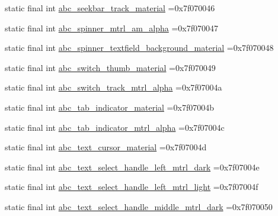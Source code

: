 \begin{DoxyCompactItemize}
\item 
static final int \mbox{\hyperlink{classcom_1_1example_1_1trainawearapplication_1_1_r_1_1drawable_a6616ac504b1ff425dd1a6e82d7d2d414}{abc\+\_\+seekbar\+\_\+track\+\_\+material}} =0x7f070046
\item 
static final int \mbox{\hyperlink{classcom_1_1example_1_1trainawearapplication_1_1_r_1_1drawable_acdfd04de80b7e99709e8a3433aac7b28}{abc\+\_\+spinner\+\_\+mtrl\+\_\+am\+\_\+alpha}} =0x7f070047
\item 
static final int \mbox{\hyperlink{classcom_1_1example_1_1trainawearapplication_1_1_r_1_1drawable_a977a4a0acc3e2d054b053ece3540e1f4}{abc\+\_\+spinner\+\_\+textfield\+\_\+background\+\_\+material}} =0x7f070048
\item 
static final int \mbox{\hyperlink{classcom_1_1example_1_1trainawearapplication_1_1_r_1_1drawable_a6940590719eb7fd3f4f55deb32408379}{abc\+\_\+switch\+\_\+thumb\+\_\+material}} =0x7f070049
\item 
static final int \mbox{\hyperlink{classcom_1_1example_1_1trainawearapplication_1_1_r_1_1drawable_a89deaa1cc3498e3c221f4bae5744af16}{abc\+\_\+switch\+\_\+track\+\_\+mtrl\+\_\+alpha}} =0x7f07004a
\item 
static final int \mbox{\hyperlink{classcom_1_1example_1_1trainawearapplication_1_1_r_1_1drawable_a365ca084d5e5f7ee46baa91a4e534ff1}{abc\+\_\+tab\+\_\+indicator\+\_\+material}} =0x7f07004b
\item 
static final int \mbox{\hyperlink{classcom_1_1example_1_1trainawearapplication_1_1_r_1_1drawable_a7102ccb9daee78a96d7b37d978595650}{abc\+\_\+tab\+\_\+indicator\+\_\+mtrl\+\_\+alpha}} =0x7f07004c
\item 
static final int \mbox{\hyperlink{classcom_1_1example_1_1trainawearapplication_1_1_r_1_1drawable_a24e8260b8942a84ca0d23532b89355f7}{abc\+\_\+text\+\_\+cursor\+\_\+material}} =0x7f07004d
\item 
static final int \mbox{\hyperlink{classcom_1_1example_1_1trainawearapplication_1_1_r_1_1drawable_acf4548910ef1cef4f46e5519dda08262}{abc\+\_\+text\+\_\+select\+\_\+handle\+\_\+left\+\_\+mtrl\+\_\+dark}} =0x7f07004e
\item 
static final int \mbox{\hyperlink{classcom_1_1example_1_1trainawearapplication_1_1_r_1_1drawable_aad970d306d563f6aa25554307f92a4dc}{abc\+\_\+text\+\_\+select\+\_\+handle\+\_\+left\+\_\+mtrl\+\_\+light}} =0x7f07004f
\item 
static final int \mbox{\hyperlink{classcom_1_1example_1_1trainawearapplication_1_1_r_1_1drawable_a05bdc56fb7ee68c5ec4415d3bcca54d3}{abc\+\_\+text\+\_\+select\+\_\+handle\+\_\+middle\+\_\+mtrl\+\_\+dark}} =0x7f070050

\end{DoxyCompactItemize}
